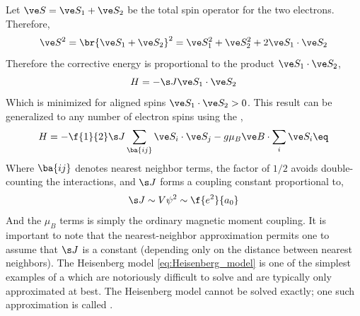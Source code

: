 \documentclass{article}
\begin{document}
Let $\ve S = \ve S_1 + \ve S_2$ be the total spin operator for the two electrons. Therefore,
\[ \ve S^2 = \br{\ve S_1 + \ve S_2}^2 = \ve S_1^2 + \ve S_2^2 + 2 \ve S_1 \cdot \ve S_2 \]
Therefore the corrective energy is proportional to the product $\ve S_1 \cdot \ve S_2$,
\[ H = - \s J \ve S_1 \cdot \ve S_2 \]
Which is minimized for aligned spins $\ve S_1 \cdot \ve S_2 > 0$. This result can be generalized to any number of electron spins using the ,
\[ H = -\f{1}{2} \s J \sum_{\ba{ij}} {\ve S_i \cdot \ve S_j} - g \mu_{B} \ve B \cdot \sum_{i} \ve S_i \eq \label{eq:Heisenberg_model}\]
Where $\ba{ij}$ denotes nearest neighbor terms, the factor of $1/2$ avoids double-counting the interactions, and $\s J$ forms a coupling constant proportional to,
\[ \s J \sim V \psi^2 \sim \f{e^2}{a_0} \]
And the $\mu_{B}$ terms is simply the ordinary magnetic moment coupling. It is important to note that the nearest-neighbor approximation permits one to assume that $\s J$ is a constant (depending only on the distance between nearest neighbors). The Heisenberg model \cref{eq:Heisenberg_model} is one of the simplest examples of a  which are notoriously difficult to solve and are typically only approximated at best. The Heisenberg model cannot be solved exactly; one such approximation is called .
\end{document}
